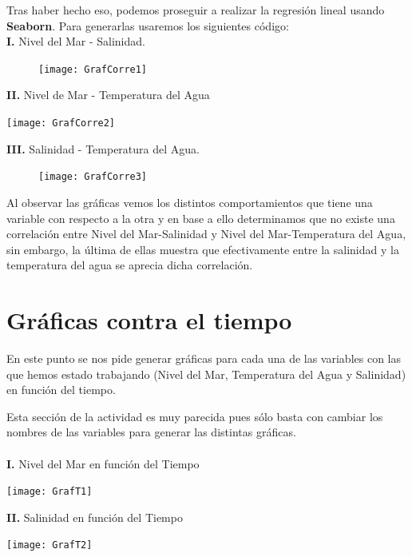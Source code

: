 Tras haber hecho eso, podemos proseguir a realizar la regresión lineal usando \textbf{Seaborn}. Para generarlas usaremos los siguientes código:\\
\textbf{I.} Nivel del Mar - Salinidad.

\begin{figure}[h!]
\centering
\texttt{[image: GrafCorre1]}
\end{figure}

\noindent \textbf{II.} Nivel de Mar - Temperatura del Agua\\
\begin{center}%
\texttt{[image: GrafCorre2]}
\end{center}

\vfill

\noindent \textbf{ III.} Salinidad - Temperatura del Agua.\\
\begin{figure}[h]
\centering
\texttt{[image: GrafCorre3]}
\end{figure}

Al observar las gráficas vemos los distintos comportamientos que tiene una variable con respecto a la otra y en base a ello determinamos que no existe una correlación entre Nivel del Mar-Salinidad y Nivel del Mar-Temperatura del Agua, sin embargo, la última de ellas muestra que efectivamente entre la salinidad y la temperatura del agua se aprecia dicha correlación.

\section{Gráficas contra el tiempo}
En este punto se nos pide generar gráficas para cada una de las variables con las que hemos estado trabajando (Nivel del Mar, Temperatura del Agua y Salinidad) en función del tiempo.

Esta sección de la actividad es muy parecida pues sólo basta con cambiar los nombres de las variables para generar las distintas gráficas.\\
\\ \textbf{I.} Nivel del Mar en función del Tiempo

\begin{center}
\texttt{[image: GrafT1]}
\end{center}


\textbf{II.} Salinidad en función del Tiempo
\begin{center}
\texttt{[image: GrafT2]}
\end{center}



